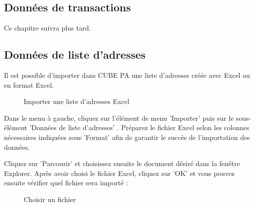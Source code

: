 \subsection{Données de transactions}

Ce chapitre suivra plus tard.

\subsection{Données de liste d'adresses}

Il est possible d'importer dans CUBE PA une liste d'adresses créée avec Excel ou en format Excel.

\begin{figure}[H]
\caption{Importer une liste d'adresses Excel}
\end{figure}

Dans le menu à gauche, cliquez sur l'élément de menu 'Importer' puis sur le sous-élément 'Données de liste d'adresses' . Préparez le fichier Excel selon les colonnes nécessaires indiquées sous 'Format'  afin de garantir le succès de l'importation des données.

\vspace{\baselineskip}

Cliquez sur 'Parcourir'  et choisissez ensuite le document désiré dans la fenêtre Explorer. Après avoir choisi le fichier Excel, cliquez sur 'OK' et vous pouvez ensuite vérifier quel fichier sera importé :

\begin{figure}[H]
\caption{Choisir un fichier}
\end{figure}

